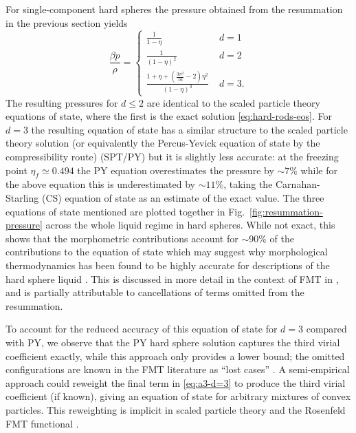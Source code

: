 \documentclass[11pt,twoside]{report}
\begin{document}
For single-component hard spheres the pressure obtained from the resummation in the previous section yields
\begin{equation}
  \frac{\beta p}{\rho} =
  \begin{cases}
    \frac{1}{1-\eta} & \; d=1 \\
    \frac{1}{(1-\eta)^2} & \; d=2 \\
    \frac{1 + \eta + (\frac{3\pi^2}{16} - 2) \eta^2}{(1-\eta)^3} & \; d=3.
  \end{cases}
\end{equation}
The resulting pressures for $d \le 2$ are identical to the scaled particle theory equations of state, where the first is the exact solution \eqref{eq:hard-rods-eos}.
For $d=3$ the resulting equation of state has a similar structure to the scaled particle theory solution (or equivalently the Percus-Yevick equation of state by the compressibility route) (SPT/PY) but it is slightly less accurate: at the freezing point $\eta_f \simeq 0.494$ the PY equation overestimates the pressure by $\sim7\%$ while for the above equation this is underestimated by $\sim11\%$, taking the Carnahan-Starling (CS) equation of state \cite{CarnahanJCP1969} as an estimate of the exact value.
The three equations of state mentioned are plotted together in Fig.\ \ref{fig:resummation-pressure} across the whole liquid regime in hard spheres.
While not exact, this shows that the morphometric contributions account for $\sim$90\% of the contributions to the equation of state which may suggest why morphological thermodynamics has been found to be highly accurate for descriptions of the hard sphere liquid \cite{RothPRL2006,LairdPRE2012,BlokhuisPRE2013,UrrutiaPRE2014,Hansen-GoosJCP2014,RobinsonPRL2019}.
This is discussed in more detail in the context of FMT in \cite{MarechalPRE2014}, and is partially attributable to cancellations of terms omitted from the resummation.

To account for the reduced accuracy of this equation of state for $d=3$ compared with PY, we observe that the PY hard sphere solution captures the third virial coefficient exactly, while this approach only provides a lower bound; the omitted configurations are known in the FMT literature as ``lost cases'' \cite{TarazonaPRE1997}.
A semi-empirical approach could reweight the final term in \eqref{eq:a3-d=3} to produce the third virial coefficient (if known), giving an equation of state for arbitrary mixtures of convex particles.
This reweighting is implicit in scaled particle theory and the Rosenfeld FMT functional \cite{TarazonaPRE1997,MarechalPRE2014}.
\end{document}
